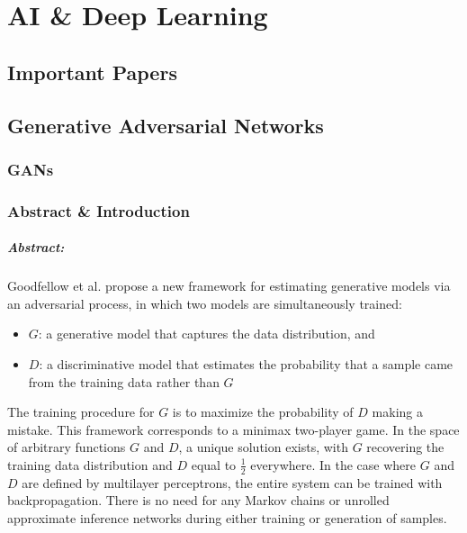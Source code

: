 \chapter{AI \& Deep Learning}

\section{Important Papers}

\cite{goodfellow2016deep}

\cite{Sing1503:Comment}

\section{Generative Adversarial Networks}

\subsection{GANs \cite{goodfellow2014generative}}

\subsection*{Abstract \& Introduction}

\paragraph*{Abstract: } Goodfellow et al. propose a new framework for estimating generative models via an adversarial process, in which two models are simultaneously trained:
\begin{itemize}
\item
	$G$: a generative model that captures the data distribution, and
\item
	$D$: a discriminative model that estimates the probability that a sample came from the training data rather than $G$
\end{itemize}
The training procedure for $G$ is to maximize the probability of $D$ making a mistake. This framework corresponds to a minimax two-player game. In the space of arbitrary functions $G$ and $D$, a unique solution exists, with $G$ recovering the training data distribution and $D$ equal to $\frac{1}{2}$ everywhere. In the case where $G$ and $D$ are defined by multilayer perceptrons, the entire system can be trained with backpropagation. There is no need for any Markov chains or unrolled approximate inference networks during either training or generation of samples.


